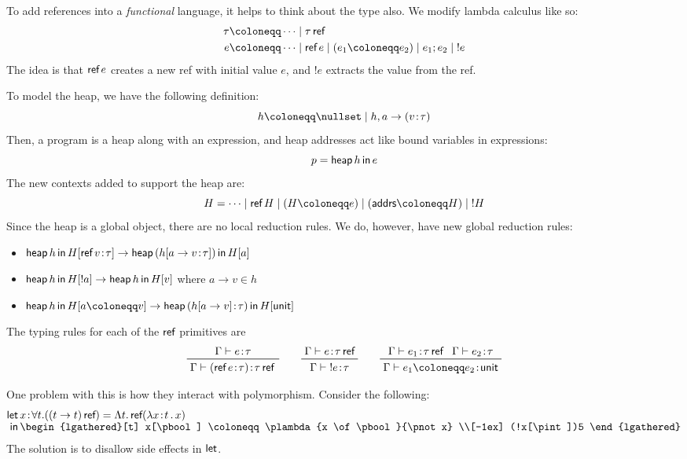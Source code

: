 \documentclass[class=scrartcl]{standalone}
\begin{document}
To add references into a \emph{functional} language,
it helps to think about the type also.
We modify lambda calculus like so:
\begin{align*}
  \tau &\coloneqq \cdots \mid \tau \pref \\
  e    &\coloneqq \cdots \mid \pref e
                         \mid (e_1 \coloneqq e_2)
                         \mid e_1 ; e_2
                         \mid {!e}
\end{align*}
The idea is that \(\operatorname{\textsf{ref}} e\) creates a new ref with initial value \(e\),
and \(!e\) extracts the value from the ref.

To model the heap, we have the following definition:
\[
  h \coloneqq \nullset \mid h, a \to (v \of \tau)
\]
Then, a program is a heap along with an expression,
and heap addresses act like bound variables in expressions:
\[
  p = \operatorname{\textsf{heap}}{h}\operatorname{\textsf{in}}{e}
\]
The new contexts added to support the heap are:
\[
  H = \dots \mid \pref H
            \mid (H \coloneqq e)
            \mid (\textsf{addrs} \coloneqq H)
            \mid {!H}
\]
Since the heap is a global object, there are no local reduction rules.
We do, however, have new global reduction rules:
\begin{itemize}[nosep]
  \item \(\operatorname{\textsf{heap}}{h}\operatorname{\textsf{in}}{H[\operatorname{\textsf{ref}} v {\hspace{0.1111em}:\hspace{0.1111em}} \tau]}
          \to \operatorname{\textsf{heap}}{(h[a \to v {\hspace{0.1111em}:\hspace{0.1111em}} \tau])}\operatorname{\textsf{in}}{H[a]}\)
  \item \(\operatorname{\textsf{heap}}{h}\operatorname{\textsf{in}}{H[!a]} \to \operatorname{\textsf{heap}}{h}\operatorname{\textsf{in}}{H[v]}\)
        where \(a \to v \in h\)
  \item \(\pheapin{h}{H[a \coloneqq v]}
          \to \pheapin{(h[a \to v] \of \tau)}{H[\punit]}\)
\end{itemize}
The typing rules for each of the \(\operatorname{\textsf{ref}}\) primitives are
\[
  \prftree{\Gamma \vdash e \of \tau}
          {\Gamma \vdash (\pref e \of \tau) \of \tau \pref} \qquad
  \prftree{\Gamma \vdash e \of \tau \pref}
          {\Gamma \vdash {!e} \of \tau} \qquad
  \prftree{\Gamma \vdash e_1 \of \tau \pref}
          {\Gamma \vdash e_2 \of \tau}
          {\Gamma \vdash e_1 \coloneqq e_2 \of \punit}
\]

One problem with this is how they interact with polymorphism.
Consider the following:
\begin{align*}
  \pname{let}{} & x \of {\forall t. ((t \to t) \pref)}
                    = \Lambda t. \pref (\plambda{x \of t}{x}) \\[-1ex]
  \pname{in}{}  & \begin{lgathered}[t]
                    x[\pbool] \coloneqq \plambda{x \of \pbool}{\pnot x} \\[-1ex]
                    (!x[\pint])5
                  \end{lgathered}
\end{align*}
The solution is to disallow side effects in \(\operatorname{\textsf{let}}\).
\end{document}
